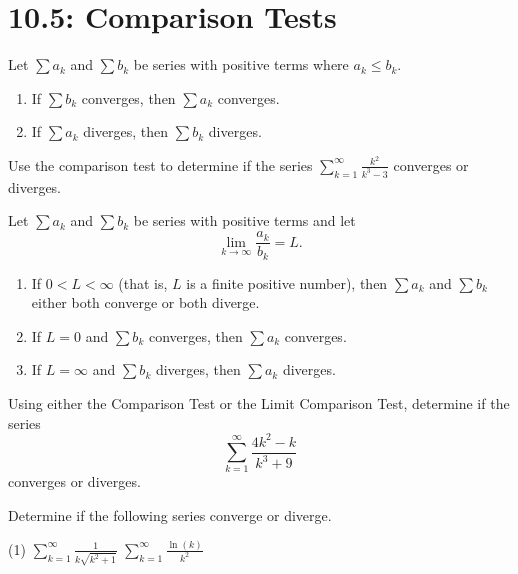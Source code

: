\documentclass[../mathNotesPreamble]{subfiles}
\begin{document}
  \section{10.5: Comparison Tests}

  \begin{thmBox*}
    Let $\sum a_k$ and $\sum b_k$ be series with positive terms where $a_k\leq b_k$. 
    \begin{enumerate}
      \item If $\sum b_k$ converges, then $\sum a_k$ converges.
      \item If $\sum a_k$ diverges, then $\sum b_k$ diverges.
    \end{enumerate}
  \end{thmBox*}
  \begin{ex*}
    Use the comparison test to determine if the series $\displaystyle\sum_{k=1}^\infty \frac{k^2}{k^3-3}$ converges or diverges.
  \end{ex*}
  \pagebreak 

  \begin{thmBox*}
    Let $\sum a_k$ and $\sum b_k$ be series with positive terms and let
      \[\lim_{k\to \infty} \frac{a_k}{b_k}=L.\]
    \begin{enumerate}
      \item If $0<L<\infty$ (that is, $L$ is a finite positive number), then $\sum a_k$ and $\sum b_k$ either both converge or both diverge.
      \item If $L=0$ and $\sum b_k$ converges, then $\sum a_k$ converges.
      \item If $L=\infty$ and $\sum b_k$ diverges, then $\sum a_k$ diverges.
    \end{enumerate}
  \end{thmBox*}
  \begin{ex*}
    Using either the Comparison Test or the Limit Comparison Test, determine if the series
      \[\sum_{k=1}^\infty \frac{4k^2-k}{k^3+9}\]
    converges or diverges.
  \end{ex*}
  \pagebreak

  \begin{ex*}
    Determine if the following series converge or diverge.
  \end{ex*}
  \begin{tasks}[after-item-skip=\stretch{1}, label=,item-indent=0pt](1)
    \task $\displaystyle\sum_{k=1}^\infty \frac{1}{k\sqrt{k^2+1}}$
    \task $\displaystyle\sum_{k=1}^\infty \frac{\ln(k)}{k^2}$
  \end{tasks}
  \pagebreak
\end{document}
